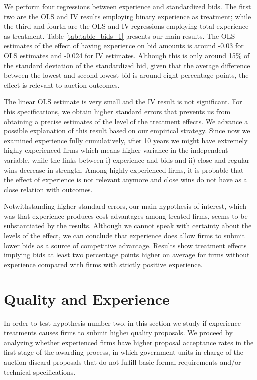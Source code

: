 We perform four regressions between experience and standardized bids. The first two are the OLS and IV results employing binary experience as treatment; while the third and fourth are the OLS and IV regressions employing total experience as treatment. Table \ref{tab:table_bids_1} presents our main results. The OLS estimates of the effect of having experience on bid amounts is around -0.03 for OLS estimates and -0.024 for IV estimates. Although this is only around 15\% of the standard deviation of the standardized bid, given that the average difference between the lowest and second lowest bid is around eight percentage points, the effect is relevant to auction outcomes.

The linear OLS estimate is very small and the IV result is not significant. For this specifications, we obtain higher standard errors that prevents us from obtaining a precise estimates of the level of the treatment effects. We advance a possible explanation of this result based on our empirical strategy. Since now we examined experience fully cumulatively, after 10 years we might have extremely highly experienced firms which means higher variance in the independent variable, while the links between i) experience and bids and ii) close and regular wins decrease in strength. Among highly experienced firms, it is probable that the effect of experience is not relevant anymore and close wins do not have as a close relation with outcomes.



Notwithstanding higher standard errors, our main hypothesis of interest, which was that experience produces cost advantages among treated firms, seems to be substantiated by the results. Although we cannot speak with certainty about the levels of the effect, we can conclude that experience does allow firms to submit lower bids as a source of competitive advantage. Results show treatment effects implying bids at least two percentage points higher on average for firms without experience compared with firms with strictly positive experience.


\section{Quality and Experience}
\label{section:qualityexp}
In order to test hypothesis number two, in this section we study if experience treatments causes firms to submit higher quality proposals. We proceed by analyzing whether experienced firms have higher proposal acceptance rates in the first stage of the awarding process, in which government units in charge of the auction discard proposals that do not fulfill basic formal requirements and/or technical specifications.

